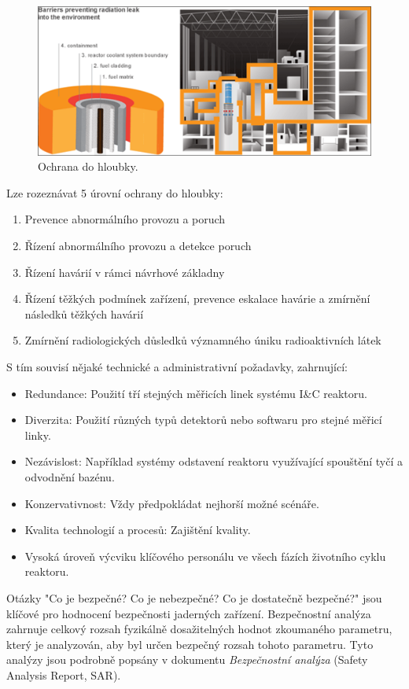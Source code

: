 \begin{figure}[H]
    \centering
    \includegraphics[width=0.75\linewidth]{img/DID.png}
    \caption{Ochrana do hloubky.}
    \label{fig:enter-label}
\end{figure}

Lze rozeznávat 5 úrovní ochrany do hloubky:

\begin{enumerate}
    \item Prevence abnormálního provozu a poruch
    \item Řízení abnormálního provozu a detekce poruch
    \item Řízení havárií v rámci návrhové základny
    \item Řízení těžkých podmínek zařízení, prevence eskalace havárie a zmírnění následků těžkých havárií
    \item Zmírnění radiologických důsledků významného úniku radioaktivních látek
\end{enumerate}

S tím souvisí nějaké technické a administrativní požadavky, zahrnující:

\begin{itemize}
    \item Redundance: Použití tří stejných měřicích linek systému I\&C reaktoru.
    \item Diverzita: Použití různých typů detektorů nebo softwaru pro stejné měřicí linky.
    \item Nezávislost: Například systémy odstavení reaktoru využívající spouštění tyčí a odvodnění bazénu.
    \item Konzervativnost: Vždy předpokládat nejhorší možné scénáře.
    \item Kvalita technologií a procesů: Zajištění kvality.
    \item Vysoká úroveň výcviku klíčového personálu ve všech fázích životního cyklu reaktoru.
\end{itemize}

Otázky "Co je bezpečné? Co je nebezpečné? Co je dostatečně bezpečné?" jsou klíčové pro hodnocení bezpečnosti jaderných zařízení. Bezpečnostní analýza zahrnuje celkový rozsah fyzikálně dosažitelných hodnot zkoumaného parametru, který je analyzován, aby byl určen bezpečný rozsah tohoto parametru. Tyto analýzy jsou podrobně popsány v dokumentu \textit{Bezpečnostní analýza} (Safety Analysis Report, SAR).

